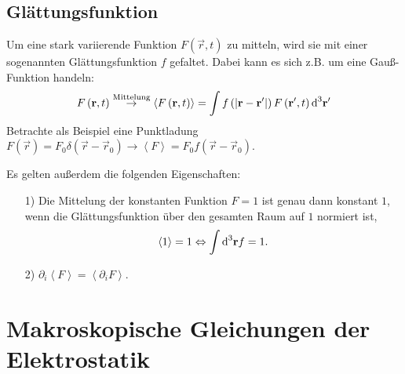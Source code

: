 \subsection{Glättungsfunktion\label{ref-037}}

Um eine stark variierende Funktion $F\left(\vec {r},t\right)$ zu mitteln, wird sie mit einer sogenannten Glättungsfunktion $f$ gefaltet. Dabei kann es sich z.B. um eine Gauß-Funktion handeln:
\begin{equation*}
	F\left(\mathbf{r},t\right) \overset{\text{Mittelung}}{\rightarrow } \left\langle F\left(\mathbf{r},t\right)\right\rangle =\int f\left(\left| \mathbf{r}-\mathbf{r}'\right| \right)F\left(\mathbf{r}',t\right)\text{d} ^{3}\mathbf{r}'
\end{equation*}
Betrachte als Beispiel eine Punktladung $F\left(\vec {r}\right)=F_{0}\delta \left(\vec {r}-\vec {r}_{0}\right)\rightarrow \left\langle F\right\rangle =F_{0}f\left(\vec {r}-\vec {r}_{0}\right)$.

Es gelten außerdem die folgenden Eigenschaften:\begin{enumerate}[1)]


	\item[1)] Die Mittelung der konstanten Funktion $F=1$ ist genau dann konstant $1$, wenn die Glättungsfunktion über den gesamten Raum auf $1$ normiert ist,
		\begin{equation*}
			\left\langle 1\right\rangle =1\Leftrightarrow \int \text{d} ^{3}\mathbf{r}f=1.
		\end{equation*}
	\item[2)] $\partial _{i}\left\langle F\right\rangle =\left\langle \partial _{i}F\right\rangle $.

\end{enumerate}
\section{Makroskopische Gleichungen der Elektrostatik\label{ref-038}}

